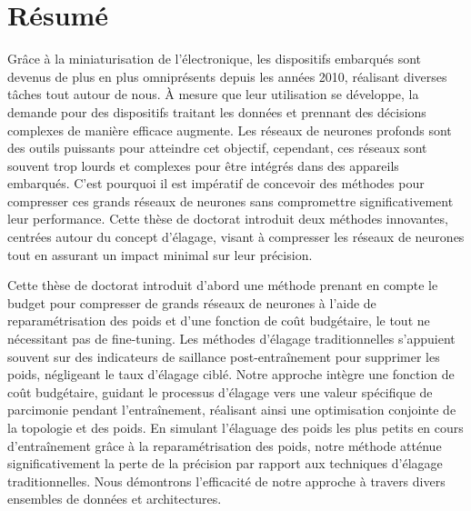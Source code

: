 \chapter*{Résumé}

Grâce à la miniaturisation de l'électronique, les dispositifs embarqués sont
devenus de plus en plus omniprésents depuis les années 2010, réalisant diverses
tâches tout autour de nous. À mesure que leur utilisation se développe, la
demande pour des dispositifs traitant les données et prennant des décisions
complexes de manière efficace augmente. Les réseaux de neurones profonds sont
des outils puissants pour atteindre cet objectif, cependant, ces réseaux sont
souvent trop lourds et complexes pour être intégrés dans des appareils
embarqués. C'est pourquoi il est impératif de concevoir des méthodes pour
compresser ces grands réseaux de neurones sans compromettre significativement
leur performance. Cette thèse de doctorat introduit deux méthodes innovantes,
centrées autour du concept d'élagage, visant à compresser les réseaux de
neurones tout en assurant un impact minimal sur leur précision.

Cette thèse de doctorat introduit d'abord une méthode prenant en compte le
budget pour compresser de grands réseaux de neurones à l'aide de
reparamétrisation des poids et d'une fonction de coût budgétaire, le tout ne
nécessitant pas de fine-tuning. Les méthodes d'élagage traditionnelles
s'appuient souvent sur des indicateurs de saillance post-entraînement pour
supprimer les poids, négligeant le taux d'élagage ciblé. Notre approche intègre
une fonction de coût budgétaire, guidant le processus d'élagage vers une valeur
spécifique de parcimonie pendant l'entraînement, réalisant ainsi une
optimisation conjointe de la topologie et des poids. En simulant l'élaguage des
poids les plus petits en cours d'entraînement grâce à la reparamétrisation des
poids, notre méthode atténue significativement la perte de la précision par
rapport aux techniques d'élagage traditionnelles. Nous démontrons l'efficacité
de notre approche à travers divers ensembles de données et architectures.


